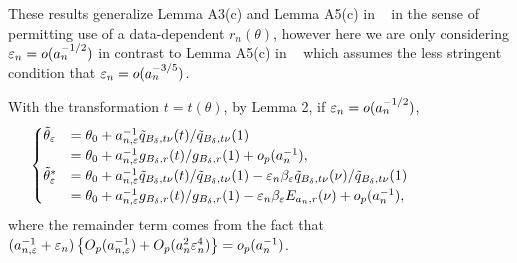 
	These results generalize Lemma A3(c) and Lemma A5(c) in ~\cite{Li2017} in the sense of permitting use of a data-dependent $r_n(\theta)$, however here we are only considering $\varepsilon_n = o(a_n^{-1/2})$ in contrast to Lemma A5(c) in ~\cite{Li2017} which assumes the less stringent condition that $\varepsilon_n = o(a_n^{-3/5})$.
	
	With the transformation $t=t(\theta)$, by Lemma 2, if $\varepsilon_{n}=o(a_{n}^{-1/2})$,
	\hspace{-2cm}\begin{eqnarray}
	\hspace{-2cm}\begin{cases}
	\tilde{\theta}_{\veps}&=\theta_{0}+a_{n,\veps}^{-1}\tilde{q}_{B_{\delta},t\nu}(t)/\tilde{q}_{B_{\delta},t\nu}(1) \\
	&=\theta_{0}+a_{n,\veps}^{-1}g_{B_{\delta},r}(t)/g_{B_{\delta},r}(1)+o_{p}(a_{n}^{-1}),\\
	\tilde{\theta}_{\veps}^{*}&=\theta_{0}+a_{n,\veps}^{-1}\tilde{q}_{B_{\delta},t\nu}(t)/\tilde{q}_{B_{\delta},t\nu}(1)-\veps_{n}\beta_{\veps}\tilde{q}_{B_{\delta},t\nu}(\nu)/\tilde{q}_{B_{\delta},t\nu}(1)\\
	&=\theta_{0}+a_{n,\veps}^{-1}g_{B_{\delta},r}(t)/g_{B_{\delta},r}(1)-\veps_{n}\beta_{\veps}E_{a_{n},r}(\nu)+o_{p}(a_{n}^{-1}),
	\end{cases}\label{eq4}
	\end{eqnarray}
	where the remainder term comes from the fact that $(a_{n,\varepsilon}^{-1}+\varepsilon_{n})\left\{ O_{p}(a_{n,\varepsilon}^{-1})+O_{p}(a_{n}^{2}\varepsilon_{n}^{4})\right\} =o_{p}(a_{n}^{-1})$.
	

